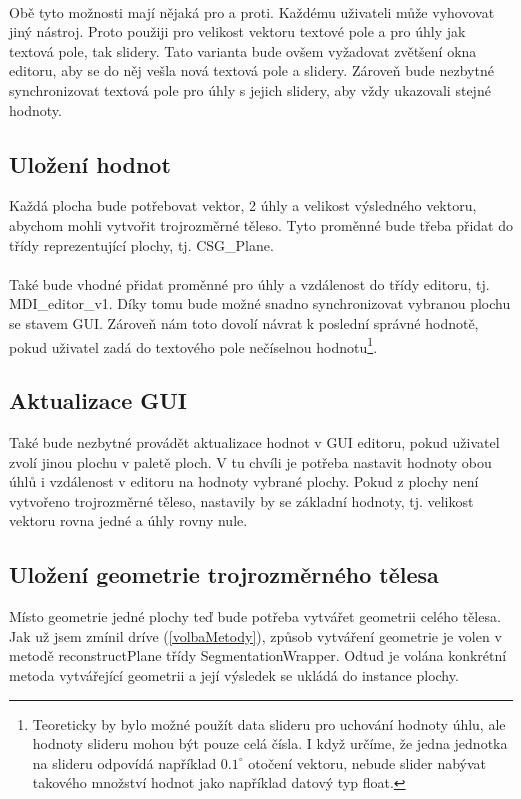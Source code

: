 \documentclass[11pt,twoside,a4paper]{book}
\begin{document}
\paragraph{}
Obě tyto možnosti mají nějaká pro a proti. Každému uživateli může vyhovovat jiný nástroj. Proto použiji pro velikost vektoru textové pole a pro úhly jak textová pole, tak slidery. Tato varianta bude ovšem vyžadovat zvětšení okna editoru, aby se do něj vešla nová textová pole a slidery. Zároveň bude nezbytné synchronizovat textová pole pro úhly s jejich slidery, aby vždy ukazovali stejné hodnoty. 

\subsection{Uložení hodnot}
Každá plocha bude potřebovat vektor, 2 úhly a velikost výsledného vektoru, abychom mohli vytvořit trojrozměrné těleso. Tyto proměnné bude třeba přidat do třídy reprezentující plochy, tj. CSG\_Plane.
\paragraph{}
Také bude vhodné přidat proměnné pro úhly a vzdálenost do třídy editoru, tj. MDI\_editor\_v1. Díky tomu bude možné snadno synchronizovat vybranou plochu se stavem GUI. Zároveň nám toto dovolí návrat k poslední správné hodnotě, pokud uživatel zadá do textového pole nečíselnou hodnotu\footnote{Teoreticky by bylo možné použít data slideru pro uchování hodnoty úhlu, ale hodnoty slideru mohou být pouze celá čísla. I když určíme, že jedna jednotka na slideru odpovídá například $0.1^{\circ}$ otočení vektoru, nebude slider nabývat takového množství hodnot jako například datový typ float.}.

\subsection{Aktualizace GUI}
Také bude nezbytné provádět aktualizace hodnot v GUI editoru, pokud uživatel zvolí jinou plochu v paletě ploch. V tu chvíli je potřeba nastavit hodnoty obou úhlů i vzdálenost v editoru na hodnoty vybrané plochy. Pokud z plochy není vytvořeno trojrozměrné těleso, nastavily by se základní hodnoty, tj. velikost vektoru rovna jedné a úhly rovny nule. 

\subsection{Uložení geometrie trojrozměrného tělesa}
Místo geometrie jedné plochy teď bude potřeba vytvářet geometrii celého tělesa. Jak už jsem zmínil dríve (\ref{volbaMetody}), způsob vytváření geometrie je volen v metodě reconstructPlane třídy SegmentationWrapper. Odtud je volána konkrétní metoda vytvářející geometrii a její výsledek se ukládá do instance plochy.
\end{document}
